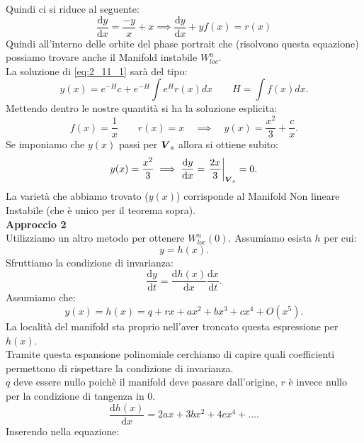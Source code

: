 \begin{exmp}[]
    Quindi ci si riduce al seguente:
    \begin{equation}
	\frac{\text{d} y}{\text{d} x} = \frac{-y}{x} + x \implies  \frac{\text{d} y}{\text{d} x}  + y f(x) = r(x) 
	\label{eq:2_11_1}
    \end{equation}
    Quindi all'interno delle orbite del phase portrait che (risolvono questa equazione) possiamo trovare anche il Manifold instabile $W_{loc}^u$.\\
    La soluzione di \ref{eq:2_11_1} sarà del tipo:
    \[
	y(x) = e^{-H}c + e^{-H}\int e^Hr(x) dx \qquad  H = \int f(x) dx
    .\] 
    Mettendo dentro le nostre quantità si ha la soluzione esplicita:
    \[
	f(x) = \frac{1}{x} \qquad  r(x) = x \quad\implies\quad  y(x) = \frac{x^2}{3} + \frac{c}{x}
    .\] 
    Se imponiamo che $y(x)$ passi per $\boldsymbol{V}_s$ allora si ottiene subito:
    \[
	y(x) = \frac{x^2}{3} \implies  \frac{\text{d} y}{\text{d} x} =\left.\frac{2x}{3}\right|_{\boldsymbol{V}_s} = 0
    .\] 
    La varietà che abbiamo trovato ($y(x)$) corrisponde al Manifold Non lineare Instabile (che è unico per il teorema sopra).\\
    \textbf{Approccio 2}\\
    Utilizziamo un altro metodo per ottenere $W_{loc}^u(0)$. Assumiamo esista $h$ per cui:
    \[
	y = h(x) 
    .\] 
    Sfruttiamo la condizione di invarianza:
    \[
	\frac{\text{d} y}{\text{d} t} = \frac{\text{d} h(x) }{\text{d} x} \frac{\text{d} x}{\text{d} t} 
    .\] 
    Assumiamo che:
    \[
	y(x) = h(x) = q + rx + ax^2 + bx^3 + cx^4 + O(x^5) 
    .\] 
    La località del manifold sta proprio nell'aver troncato questa espressione per $h(x)$.\\
    Tramite questa espansione polinomiale cerchiamo di capire quali coefficienti permettono di rispettare la condizione di invarianza.\\
    $ q$ deve essere nullo poichè il manifold deve passare dall'origine, $r$ è invece nullo per la condizione di tangenza in $0$.
    \[
	\frac{\text{d} h(x) }{\text{d} x} = 2ax + 3bx^2+ 4cx^4 + \ldots
    .\] 
    Inserendo nella equazione:

\end{exmp}
